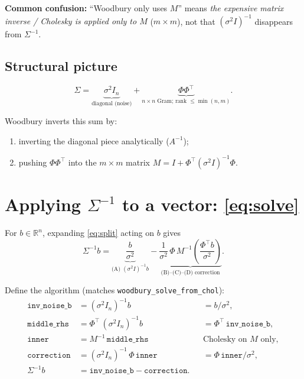 \documentclass[11pt]{article}
\newcommand{\noise}{\sigma^2}
\newcommand{\Sig}{\Sigma}
\newcommand{\Ph}{\Phi}
\begin{document}
\begin{diffbox}
\textbf{Common confusion:} ``Woodbury only uses $M$'' means \emph{the expensive matrix inverse / Cholesky
is applied only to $M$} ($m\times m$), not that $(\noise I)^{-1}$ disappears from $\Sig^{-1}$.
\end{diffbox}

\subsection{Structural picture}

\[
  \Sig
  = \underbrace{\noise I_n}_{\text{diagonal (noise)}}
  + \underbrace{\Ph\Ph^{\top}}_{\text{$n\times n$ Gram; rank $\le \min(n,m)$}}.
\]

Woodbury inverts this sum by:
\begin{enumerate}
  \item inverting the diagonal piece analytically ($A^{-1}$);
  \item pushing $\Ph\Ph^{\top}$ into the $m\times m$ matrix $M = I + \Ph^{\top}(\noise I)^{-1}\Ph$.
\end{enumerate}

\section{Applying $\Sig^{-1}$ to a vector: \eqref{eq:solve}}
\label{sec:solve}

For $b\in\mathbb{R}^n$, expanding \eqref{eq:split} acting on $b$ gives
\begin{equation}
  \label{eq:solve}
  \Sig^{-1} b
  = \underbrace{\frac{b}{\noise}}_{\text{(A) } (\noise I)^{-1}b}
  - \underbrace{\frac{1}{\noise}\,\Ph\,M^{-1}\!\left(\frac{\Ph^{\top} b}{\noise}\right)}_{\text{(B)--(C)--(D) correction}}.
\end{equation}

Define the algorithm (matches \texttt{woodbury\_solve\_from\_chol}):
\begin{align}
  \texttt{inv\_noise\_b} &= (\noise I_n)^{-1} b &&= b/\noise, \label{step:a}\\
  \texttt{middle\_rhs} &= \Ph^{\top}\,(\noise I_n)^{-1} b &&= \Ph^{\top}\,\texttt{inv\_noise\_b}, \label{step:bd}\\
  \texttt{inner} &= M^{-1}\,\texttt{middle\_rhs} &&\text{Cholesky on $M$ only}, \label{step:c}\\
  \texttt{correction} &= (\noise I_n)^{-1}\,\Ph\,\texttt{inner} &&= \Ph\,\texttt{inner}/\noise, \label{step:b2}\\
  \Sig^{-1}b &= \texttt{inv\_noise\_b} - \texttt{correction}. \label{step:final}
\end{align}
\end{document}
